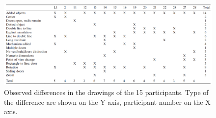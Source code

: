 \documentclass[12pt]{article}
\begin{document}
\begin{figure}[H]
  \centering
  \includegraphics[width=\linewidth]{images/table_differences_of_solutions.PNG}
  \caption{\label{fig:summary_differences}Observed differences in the drawings of the 15 participants. Type of the difference are shown on the Y axis, participant number on the X axis.
}
  
\end{figure}     
\end{document}
